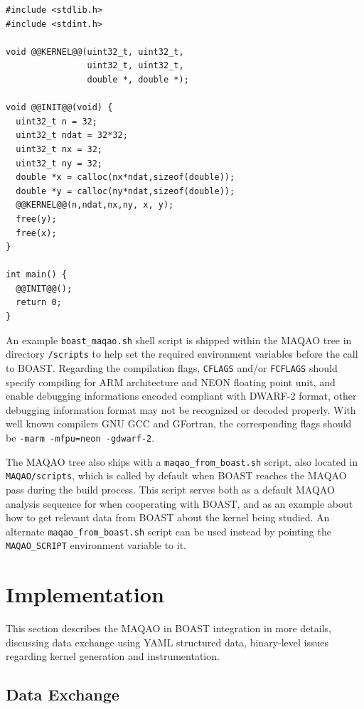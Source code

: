 \documentclass[11pt, a4paper, twoside]{montblanc2}
\begin{document}
\lstset{style=C}
\begin{lstlisting}
#include <stdlib.h>
#include <stdint.h>

void @@KERNEL@@(uint32_t, uint32_t,
                uint32_t, uint32_t,
                double *, double *);

void @@INIT@@(void) {
  uint32_t n = 32;
  uint32_t ndat = 32*32;
  uint32_t nx = 32;
  uint32_t ny = 32;
  double *x = calloc(nx*ndat,sizeof(double));
  double *y = calloc(ny*ndat,sizeof(double));
  @@KERNEL@@(n,ndat,nx,ny, x, y);
  free(y);
  free(x);
}

int main() {
  @@INIT@@();
  return 0;
}
\end{lstlisting}

An example \verb|boast_maqao.sh| shell script is shipped within the MAQAO tree in directory 
\verb|/scripts| to help set the required environment variables before the call to BOAST. Regarding 
the compilation flags, \texttt{CFLAGS} and/or \texttt{FCFLAGS} should specify compiling for ARM 
architecture and NEON floating point unit, and enable debugging informations encoded compliant with 
DWARF-2 format, other debugging information format may not be recognized or decoded properly. With 
well known compilers GNU GCC and GFortran, the corresponding flags should be
\verb|-marm -mfpu=neon -gdwarf-2|.

The MAQAO tree also ships with a \verb|maqao_from_boast.sh| script, also located in 
\verb|MAQAO/scripts|, which is called by default when BOAST reaches the MAQAO pass during the build 
process. This script serves both as a default MAQAO analysis sequence for when cooperating with 
BOAST, and as an example about how to get relevant data from BOAST about the kernel being studied. 
An alternate \verb|maqao_from_boast.sh| script can be used instead by pointing the 
\verb|MAQAO_SCRIPT| environment variable to it.

\section{Implementation}\label{sec:implementation}

This section describes the MAQAO in BOAST integration in more details, discussing data exchange 
using YAML structured data, binary-level issues regarding kernel generation and instrumentation.

\subsection{Data Exchange}
\end{document}
